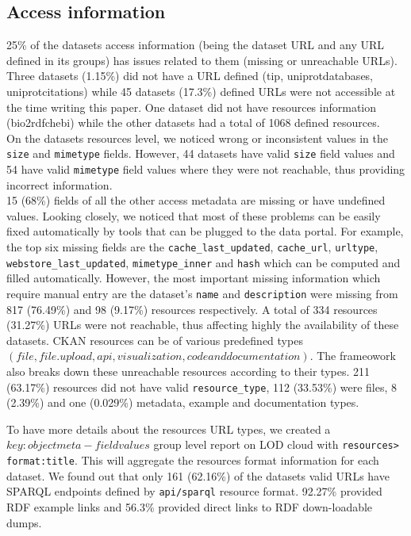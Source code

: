 \documentclass[runningheads,a4paper]{llncs}
\begin{document}
\subsection{Access information} 25\% of the datasets access information (being the dataset URL and any URL defined in its groups) has issues related to them (missing or unreachable URLs).
Three datasets (1.15\%) did not have a URL defined (tip, uniprot\-databases, uniprot\-citations) while 45 datasets (17.3\%) defined URLs were not accessible at the time writing this paper. One dataset did not have resources information (bio2rdf\-chebi) while the other datasets had a total of 1068 defined resources.\\
On the datasets resources level, we noticed wrong or inconsistent values in the \texttt{size} and \texttt{mimetype} fields. However, 44 datasets have valid \texttt{size} field values and 54 have valid \texttt{mimetype} field values where they were not reachable, thus providing incorrect information.\\
15 (68\%) fields of all the other access metadata are missing or have undefined values. Looking closely, we noticed that most of these problems can be easily fixed automatically by tools that can be plugged to the data portal. For example, the top six missing fields are the \texttt{cache\_last\_updated}, \texttt{cache\_url}, \texttt{url\-type}, \texttt{webstore\_last\_updated}, \texttt{mimetype\-\_inner} and \texttt{hash} which can be computed and filled automatically. However, the most important missing information which require manual entry are the dataset's \texttt{name} and \texttt{description} were missing from 817 (76.49\%) and 98 (9.17\%) resources respectively.
A total of 334 resources (31.27\%) URLs were not reachable, thus affecting highly the availability of these datasets. CKAN resources can be of various predefined types $(file, file.upload, api, visualization, code and documentation)$. The frameowork also breaks down these unreachable resources according to their types. 211 (63.17\%) resources did not have valid \texttt{resource\_type}, 112 (33.53\%) were files, 8 (2.39\%) and one (0.029\%) metadata, example and documentation types.

To have more details about the resources URL types, we created a $key:object meta-field values$ group level report on LOD cloud with \texttt{resources>\\format:title}. This will aggregate the resources format information for each dataset. We found out that only 161 (62.16\%) of the datasets valid URLs have SPARQL endpoints defined by \texttt{api/sparql} resource format. 92.27\% provided RDF example links and 56.3\% provided direct links to RDF down-loadable dumps.
\end{document}

